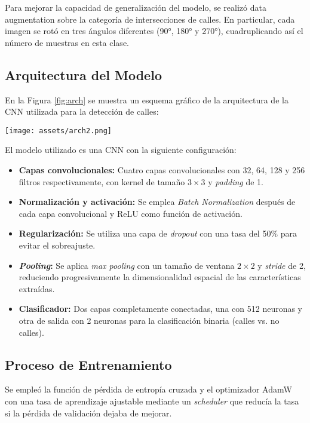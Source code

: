 \documentclass[twocolumn, fontsize=10pt]{article}
\begin{document}
Para mejorar la capacidad de generalización del modelo, se realizó data augmentation sobre la categoría de intersecciones de calles. En particular, cada imagen se rotó en tres ángulos diferentes (90°, 180° y 270°), cuadruplicando así el número de muestras en esta clase.

\subsection{Arquitectura del Modelo}

En la Figura \ref{fig:arch} se muestra un esquema gráfico de la arquitectura de la CNN utilizada para la detección de calles:

\begin{figure*}[h]
    \centering
    \texttt{[image: assets/arch2.png]}
    \caption{Esquema de la arquitectura de la CNN utilizada.}
    \label{fig:arch}
\end{figure*}

El modelo utilizado es una CNN con la siguiente configuración:

\begin{itemize}
    \item \textbf{Capas convolucionales:} Cuatro capas convolucionales con 32, 64, 128 y 256 filtros respectivamente, con kernel de tamaño $3\times3$ y \textit{padding} de 1.
    \item \textbf{Normalización y activación:} Se emplea \textit{Batch Normalization} después de cada capa convolucional y ReLU como función de activación.
    \item \textbf{Regularización:} Se utiliza una capa de \textit{dropout} con una tasa del 50\% para evitar el sobreajuste.
    \item \textbf{\textit{Pooling}:} Se aplica \textit{max pooling} con un tamaño de ventana $2\times2$ y \textit{stride} de 2, reduciendo progresivamente la dimensionalidad espacial de las características extraídas.
    \item \textbf{Clasificador:} Dos capas completamente conectadas, una con 512 neuronas y otra de salida con 2 neuronas para la clasificación binaria (calles vs. no calles).
\end{itemize}

\subsection{Proceso de Entrenamiento}
Se empleó la función de pérdida de entropía cruzada y el optimizador AdamW con una tasa de aprendizaje ajustable mediante un \textit{scheduler} que reducía la tasa si la pérdida de validación dejaba de mejorar.
\end{document}
